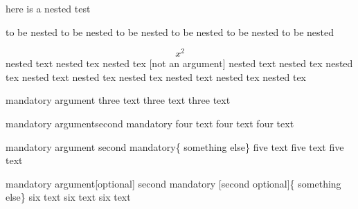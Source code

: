 here is a nested test
\begin{one}
	to be nested to be nested
	to be nested to be nested
	to be nested to be nested
	\begin{two}
		\[ x^2\]
		nested text nested tex nested tex [not an argument]
		nested text nested tex nested tex
		nested text nested tex nested tex
		nested text nested tex nested tex
	\end{two}
\end{one}
\begin{three}{mandatory argument}
	three text
	three text
	three text
\end{three}
\begin{four}{mandatory argument}{second mandatory}
	four text
	four text
	four text
\end{four}
\begin{five}[optional] {mandatory argument} {second mandatory}\{ something else\}
	five text
	five text
	five text
\end{five}
\begin{six} {mandatory argument}[optional] {second mandatory}    [second optional]\{ something else\}
	six text
	six text
	six text
\end{six}
